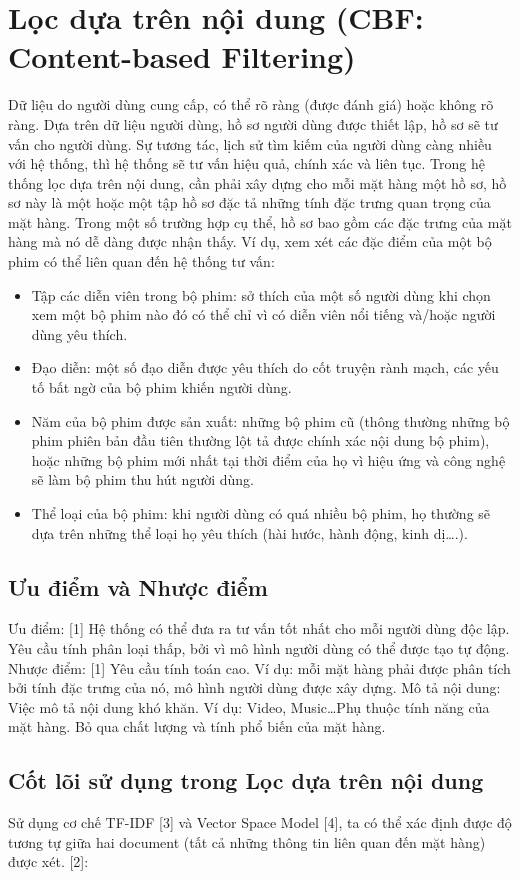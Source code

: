 \documentclass[a4paper,12pt,numbered,print,index,custombib, oneside, custommargin]{report}
\begin{document}
\section{Lọc dựa trên nội dung (CBF: Content-based Filtering)}
Dữ liệu do người dùng cung cấp, có thể rõ ràng (được đánh giá) hoặc không rõ ràng. Dựa trên dữ liệu người dùng, hồ sơ người dùng được thiết lập, hồ sơ sẽ tư vấn cho người dùng. Sự tương tác, lịch sử tìm kiếm của người dùng càng nhiều với hệ thống, thì hệ thống sẽ tư vấn hiệu quả, chính xác và liên tục. 
Trong hệ thống lọc dựa trên nội dung, cần phải xây dựng cho mỗi mặt hàng một hồ sơ, hồ sơ này là một hoặc một tập hồ sơ đặc tả những tính đặc trưng quan trọng của mặt hàng. Trong một số trường hợp cụ thể, hồ sơ bao gồm các đặc trưng của mặt hàng mà nó dễ dàng được nhận thấy. Ví dụ, xem xét các đặc điểm của một bộ phim có thể liên quan đến hệ thống tư vấn:
\begin{itemize}
\item Tập các diễn viên trong bộ phim: sở thích của một số người dùng khi chọn xem một bộ phim nào đó có thể chỉ vì có diễn viên nổi tiếng và/hoặc người dùng yêu thích.
\item Đạo diễn: một số đạo diễn được yêu thích do cốt truyện rành mạch, các yếu tố bất ngờ của bộ phim khiến người dùng.
\item Năm của bộ phim được sản xuất: những bộ phim cũ (thông thường những bộ phim phiên bản đầu tiên thường lột tả được chính xác nội dung bộ phim), hoặc những bộ phim mới nhất tại thời điểm của họ vì hiệu ứng và công nghệ sẽ làm bộ phim thu hút người dùng.
\item Thể loại của bộ phim: khi người dùng có quá nhiều bộ phim, họ thường sẽ dựa trên những thể loại họ yêu thích (hài hước, hành động, kinh dị….).
\end{itemize}

\subsection{Ưu điểm và Nhược điểm}
Ưu điểm: [1]	Hệ thống có thể đưa ra tư vấn tốt nhất cho mỗi người dùng độc lập. Yêu cầu tính phân loại thấp, bởi vì mô hình người dùng có thể được tạo tự động.
Nhược điểm: [1]   Yêu cầu tính toán cao. Ví dụ: mỗi mặt hàng phải được phân tích bởi tính đặc trưng của nó, mô hình người dùng được xây dựng. Mô tả nội dung: Việc mô tả nội dung khó khăn. Ví dụ: Video, Music…Phụ thuộc tính năng của mặt hàng. Bỏ qua chất lượng và tính phổ biến của mặt hàng.

\subsection{Cốt lõi sử dụng trong Lọc dựa trên nội dung}
Sử dụng cơ chế TF-IDF [3] và Vector Space Model [4], ta có thể xác định được độ tương tự giữa hai document (tất cả những thông tin liên quan đến mặt hàng) được xét. [2]:
\end{document}
